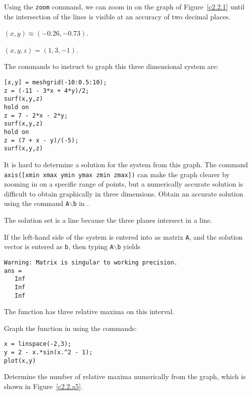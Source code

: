 \documentclass{ximera}
\begin{document}
Using the {\tt zoom} command, we can zoom in on the graph of
Figure~\ref{c2.2.1} until the intersection of the lines is
visible at an accuracy of two decimal places.  

\begin{figure}[htb]
                       \centerline{%
                       }
\end{figure}

$(x,y) \approx (-0.26,-0.73)$.

\newpage
{}
\ans $(x,y,z) = (1,3,-1)$.

\soln The commands to instruct \Matlab to graph this three dimensional
system are:
\begin{verbatim}
[x,y] = meshgrid(-10:0.5:10);
z = (-11 - 3*x + 4*y)/2;
surf(x,y,z)
hold on 
z = 7 - 2*x - 2*y;
surf(x,y,z)
hold on
z = (7 + x - y)/(-5);
surf(x,y,z)
\end{verbatim}
It is hard to determine a solution for the system from this graph.
The command {\tt axis([xmin xmax ymin ymax zmin zmax])} can make the
graph clearer by zooming in on a specific range of points, but a
numerically accurate solution is difficult to obtain graphically in
three dimensions.  Obtain an accurate solution using the command
{\tt A}$\backslash${\tt b} in \Matlabp.

\ans The solution set is a line because the three planes intersect in a line.

\soln If the left-hand side of the system is entered into \Matlab as
matrix {\tt A}, and the solution vector is entered as {\tt b}, then
typing {\tt A}$\backslash${\tt b} yields
\begin{verbatim}
Warning: Matrix is singular to working precision.
ans =
   Inf
   Inf
   Inf
\end{verbatim}

\ans The function has three relative maxima on this interval.

\soln Graph the function in \Matlab using the commands:
\begin{verbatim}
x = linspace(-2,3);
y = 2 - x.*sin(x.^2 - 1);
plot(x,y)
\end{verbatim}
Determine the number of relative maxima numerically from the graph, which
is shown in Figure~\ref{c2.2.a5}.

\begin{figure}[htb]
                       \centerline{%
                       }
\end{figure}
\end{document}
